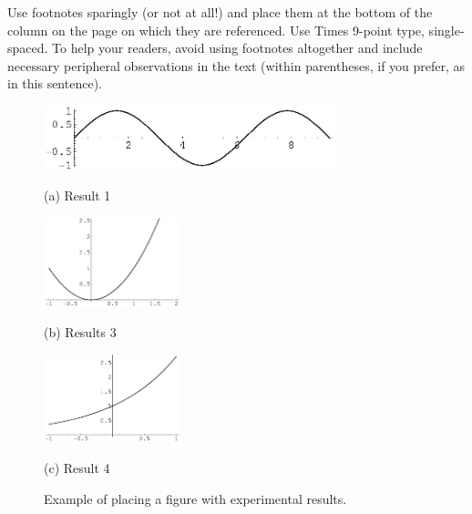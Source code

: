 \documentclass{article}
\begin{document}
Use footnotes sparingly (or not at all!) and place them at the bottom of the
column on the page on which they are referenced. Use Times 9-point type,
single-spaced. To help your readers, avoid using footnotes altogether and
include necessary peripheral observations in the text (within parentheses, if
you prefer, as in this sentence).

\begin{figure}[t]

\begin{minipage}[b]{1.0\linewidth}
  \centering
  \centerline{\includegraphics[width=8.5cm]{Figures/image1}}
  \centerline{(a) Result 1}\medskip
\end{minipage}
%
\begin{minipage}[b]{.48\linewidth}
  \centering
  \centerline{\includegraphics[width=4.0cm]{Figures/image3}}
  \centerline{(b) Results 3}\medskip
\end{minipage}
\hfill
\begin{minipage}[b]{0.48\linewidth}
  \centering
  \centerline{\includegraphics[width=4.0cm]{Figures/image4}}
  \centerline{(c) Result 4}\medskip
\end{minipage}
%
\caption{Example of placing a figure with experimental results.}
\label{fig:res}
%
\end{figure}
\end{document}
